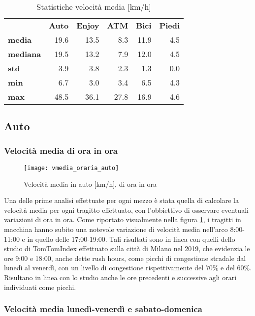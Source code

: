 \begin{table}[H]
\centering
\begin{tabular}{ | l r r r r r | }
\hline
& \textbf{Auto} & \textbf{Enjoy} & \textbf{ATM} & \textbf{Bici} & \textbf{Piedi} \\
\textbf{media}   & 19.6 & 13.5 &  8.3 & 11.9 & 4.5 \\
\textbf{mediana} & 19.5 & 13.2 &  7.9 & 12.0 & 4.5 \\
\textbf{std}     &  3.9 &  3.8 &  2.3 &  1.3 & 0.0 \\
\textbf{min}     &  6.7 &  3.0 &  3.4 &  6.5 & 4.3 \\
\textbf{max}     & 48.5 & 36.1 & 27.8 & 16.9 & 4.6 \\
\hline
\end{tabular}
\caption{Statistiche velocità media [km/h]}
\label{table:3}
\end{table}

\subsection{Auto}

\subsubsection{Velocità media di ora in ora}

\begin{figure}[H]
\texttt{[image: vmedia\_oraria\_auto]}
\caption{Velocità media in auto [km/h], di ora in ora}
\label{image:3}
\end{figure}

Una delle prime analisi effettuate per ogni mezzo è stata quella di calcolare la velocità media per ogni tragitto effettuato, con l'obbiettivo di osservare eventuali variazioni di ora in ora. Come riportato visualmente nella figura \ref{image:3}, i tragitti in macchina hanno subito una notevole variazione di velocità media nell'arco 8:00-11:00 e in quello delle 17:00-19:00. Tali risultati sono in linea con quelli dello studio di TomTomIndex\cite{tomtomindexmilan} effettuato sulla città di Milano nel 2019, che evidenzia le ore 9:00 e 18:00, anche dette rush hours, come picchi di congestione stradale dal lunedì al venerdì, con un livello di congestione rispettivamente del 70\% e del 60\%. Risultano in linea con lo studio anche le ore precedenti e successive agli orari individuati come picchi.

\subsubsection{Velocità media lunedì-venerdì e sabato-domenica}

